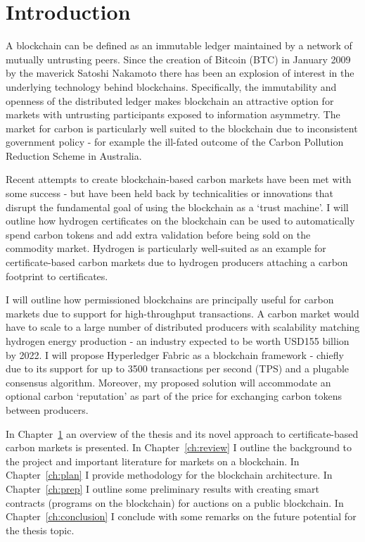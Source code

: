 \chapter{Introduction}\label{ch:intro}
A blockchain can be defined as an immutable ledger maintained by a network of 
mutually untrusting peers. Since the creation of Bitcoin (BTC) in January 2009 
by the maverick Satoshi Nakamoto there has been an explosion of interest in 
the underlying technology behind blockchains. Specifically, the 
immutability and openness of the distributed ledger makes blockchain an 
attractive option for markets with untrusting participants exposed to 
information asymmetry. The market for carbon is particularly well suited to 
the blockchain due to inconsistent government policy - for example the 
ill-fated outcome of the Carbon Pollution Reduction Scheme in Australia. 

Recent attempts to create blockchain-based carbon markets have been met 
with some success - but have been held back by technicalities or innovations 
that disrupt the fundamental goal of using the blockchain as a ‘trust machine’. 
I will outline how hydrogen certificates on the blockchain can be used to 
automatically spend carbon tokens and add extra validation before being 
sold on the commodity market. Hydrogen is particularly well-suited as an 
example for certificate-based carbon markets due to hydrogen producers 
attaching a carbon footprint to certificates. 

I will outline how permissioned blockchains are principally useful for 
carbon markets due to support for high-throughput transactions. 
A carbon market would have to scale to a large number of distributed 
producers with scalability matching hydrogen energy production - 
an industry expected to be worth USD155 billion by 2022. I will propose 
Hyperledger Fabric as a blockchain framework - chiefly due to its support 
for up to 3500 transactions per second (TPS) and a plugable consensus 
algorithm. Moreover, my proposed solution will accommodate an optional 
carbon ‘reputation’ as part of the price for exchanging carbon tokens 
between producers. 

In Chapter~\ref{ch:intro} an overview of the thesis and its novel 
approach to certificate-based carbon markets is presented. 
In Chapter~\ref{ch:review} I outline the background to the project and 
important literature for markets on a blockchain. In Chapter~\ref{ch:plan} 
I provide methodology for the blockchain architecture. 
In Chapter~\ref{ch:prep} I outline some preliminary results with 
creating smart contracts (programs on the blockchain) for auctions on a 
public blockchain. In Chapter~\ref{ch:conclusion} I conclude with some 
remarks on the future potential for the thesis topic. 


